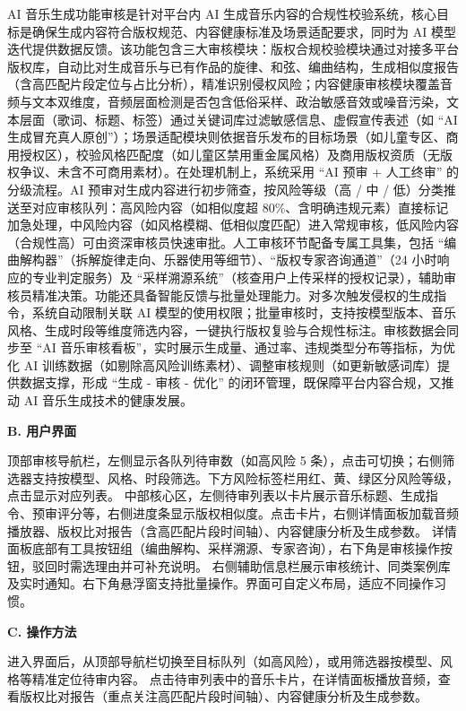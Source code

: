 \documentclass{base}
\numberwithin{figure}{section} %
\begin{document}
AI 音乐生成功能审核是针对平台内 AI 生成音乐内容的合规性校验系统，核心目标是确保生成内容符合版权规范、内容健康标准及场景适配要求，同时为 AI 模型迭代提供数据反馈。​
该功能包含三大审核模块：版权合规校验模块通过对接多平台版权库，自动比对生成音乐与已有作品的旋律、和弦、编曲结构，生成相似度报告（含高匹配片段定位与占比分析），精准识别侵权风险；内容健康审核模块覆盖音频与文本双维度，音频层面检测是否包含低俗采样、政治敏感音效或噪音污染，文本层面（歌词、标题、标签）通过关键词库过滤敏感信息、虚假宣传表述（如 “AI 生成冒充真人原创”）；场景适配模块则依据音乐发布的目标场景（如儿童专区、商用授权区），校验风格匹配度（如儿童区禁用重金属风格）及商用版权资质（无版权争议、未含不可商用素材）。​
在处理机制上，系统采用 “AI 预审 + 人工终审” 的分级流程。AI 预审对生成内容进行初步筛查，按风险等级（高 / 中 / 低）分类推送至对应审核队列：高风险内容（如相似度超 80\%、含明确违规元素）直接标记加急处理，中风险内容（如风格模糊、低相似度匹配）进入常规审核，低风险内容（合规性高）可由资深审核员快速审批。人工审核环节配备专属工具集，包括 “编曲解构器”（拆解旋律走向、乐器使用等细节）、“版权专家咨询通道”（24 小时响应的专业判定服务）及 “采样溯源系统”（核查用户上传采样的授权记录），辅助审核员精准决策。​
功能还具备智能反馈与批量处理能力。对多次触发侵权的生成指令，系统自动限制关联 AI 模型的使用权限；批量审核时，支持按模型版本、音乐风格、生成时段等维度筛选内容，一键执行版权复验与合规性标注。审核数据会同步至 “AI 音乐审核看板”，实时展示生成量、通过率、违规类型分布等指标，为优化 AI 训练数据（如剔除高风险训练素材）、调整审核规则（如更新敏感词库）提供数据支撑，形成 “生成 - 审核 - 优化” 的闭环管理，既保障平台内容合规，又推动 AI 音乐生成技术的健康发展。

\textbf{B. 用户界面}

顶部审核导航栏，左侧显示各队列待审数（如高风险 5 条），点击可切换；右侧筛选器支持按模型、风格、时段筛选。下方风险标签栏用红、黄、绿区分风险等级，点击显示对应列表。
中部核心区，左侧待审列表以卡片展示音乐标题、生成指令、预审评分等，右侧进度条显示版权相似度。点击卡片，右侧详情面板加载音频播放器、版权比对报告（含高匹配片段时间轴）、内容健康分析及生成参数。
详情面板底部有工具按钮组（编曲解构、采样溯源、专家咨询），右下角是审核操作按钮，驳回时需选理由并可补充说明。
右侧辅助信息栏展示审核统计、同类案例库及实时通知。右下角悬浮窗支持批量操作。界面可自定义布局，适应不同操作习惯。

\textbf{C. 操作方法}

进入界面后，从顶部导航栏切换至目标队列（如高风险），或用筛选器按模型、风格等精准定位待审内容。
点击待审列表中的音乐卡片，在详情面板播放音频，查看版权比对报告（重点关注高匹配片段时间轴）、内容健康分析及生成参数。
\end{document}
